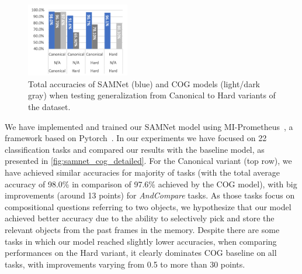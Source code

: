 \begin{figure}
	\centering
	\includegraphics[width=0.4\textwidth]{results/samnet_cog_overall_transfer.png}
	\caption{Total accuracies of SAMNet (blue) and COG models (light/dark gray) when testing generalization from Canonical to Hard variants of the dataset.}
	\label{fig:samnet_cog_overall_transfer}
\end{figure}

We have implemented and trained our SAMNet model using MI-Prometheus~\cite{kornuta2018accelerating}, a framework based on Pytorch~\cite{paszke2017automatic}. 
In our experiments we have focused on 22 classification tasks and compared our results with the baseline model, as presented in \cref{fig:samnet_cog_detailed}.
For the Canonical variant (top row), we have achieved similar accuracies for majority of tasks (with the total average accuracy of 98.0\% in comparison of 97.6\% achieved by the COG model), with big improvements (around 13 points) for \textit{AndCompare} tasks.
As those tasks focus on compositional questions referring to two objects, we hypothesize that our model achieved better accuracy due to the ability to selectively pick and store the relevant objects from the past frames in the memory.
Despite there are some tasks in which our model reached slightly lower accuracies,
when comparing performances on the Hard variant, it clearly dominates COG baseline on all tasks, with improvements varying from 0.5 to more than 30 points.

